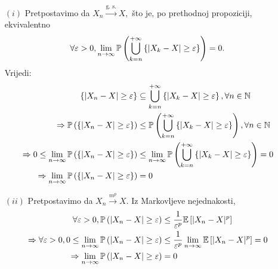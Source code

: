 \documentclass{article}
\begin{document}
\begin{itemize}
    \item[\((i)\)] Pretpostavimo da \(X_n\overset{\text{g. s.}}{\longrightarrow}X,\) što je, po prethodnoj propoziciji, ekvivalentno \[\forall \varepsilon>0,\lim_{n\to\infty}\Bbb P\left(\bigcup_{k=n}^{+\infty}\left\{|X_k-X|\ge\varepsilon\right\}\right)=0.\] Vrijedi: \[\begin{aligned}\left\{|X_n-X|\ge\varepsilon\right\}&\subseteq\bigcup_{k=n}^{+\infty}\left\{|X_k-X|\ge\varepsilon\right\},\forall n\in\Bbb N\\\Rightarrow\Bbb P\left(\left\{|X_n-X|\ge\varepsilon\right\}\right)&\le\Bbb P\left(\bigcup_{k=n}^{+\infty}\left\{|X_k-X|\ge\varepsilon\right\}\right),\forall n\in\Bbb N\\\Rightarrow0\le \lim_{n\to\infty}\Bbb P\left(\left\{|X_n-X|\ge\varepsilon\right\}\right)&\le\lim_{n\to\infty}\Bbb P\left(\bigcup_{k=n}^{+\infty}\left\{|X_k-X|\ge\varepsilon\right\}\right)=0\\\Rightarrow \lim_{n\to\infty}\Bbb P\left(\left\{|X_n-X|\ge\varepsilon\right\}\right)&=0\end{aligned}\]
    \item[\((ii)\)] Pretpostavimo da \(X_n\overset{m^p}{\longrightarrow}X.\) Iz Markovljeve nejednakosti, \[\begin{aligned}\forall\varepsilon>0,\Bbb P\left(|X_n-X|\ge\varepsilon\right)&\le\frac1{\varepsilon^p}\Bbb E\left[|X_n-X|^p\right]\\\Rightarrow\forall\varepsilon>0,0\le\lim_{n\to\infty}\Bbb P\left(|X_n-X|\ge\varepsilon\right)&\le\frac1{\varepsilon^p}\lim_{n\to\infty}\Bbb E\left[|X_n-X|^p\right]=0\\\Rightarrow\lim_{n\to\infty}\Bbb P\left(|X_n-X|\ge\varepsilon\right)&=0\end{aligned}\]

\end{itemize}
\end{document}
